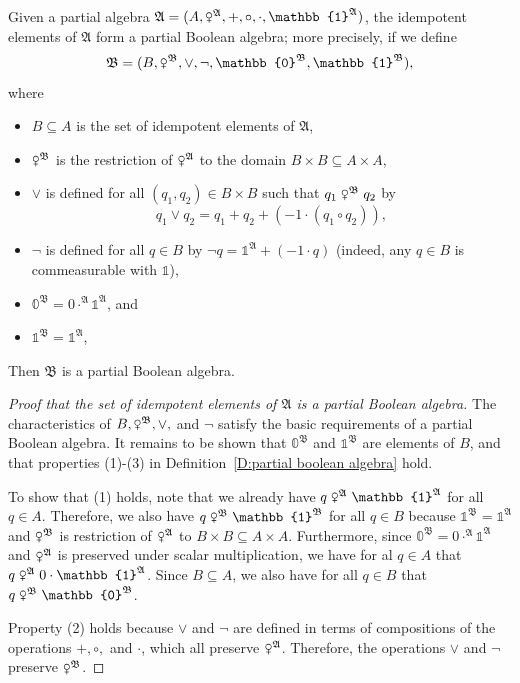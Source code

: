 \documentclass{scrartcl}
\newcommand{\FA}{\mathfrak{A}}
\newcommand{\FB}{\mathfrak{B}}
\newcommand{\com}{\mathrel{\venus}}
\begin{document}
\begin{example}
Given a partial algebra $\FA=(A,\com^{\FA},+,\circ,\cdot,\mathbb{1}^{\FA})$, the idempotent elements of $\FA$ form a partial Boolean algebra; more precisely, if we define
\[
\FB=(B,\com^{\FB},\lor,\neg,\mathbb{0}^{\FB},\mathbb{1}^{\FB}),
\]
where
\begin{itemize}
\item
$B\subseteq A$ is the set of idempotent elements of $\FA$,

\item
$\com^{\FB}$ is the restriction of $\com^{\FA}$ to the domain $B\times B\subseteq A\times A$,

\item
$\lor$ is defined for all $(q_1,q_2)\in B\times B$ such that $q_1\com^{\FB}q_2$ by
\[
q_1\lor q_2=q_1+q_2+(-1\cdot(q_1\circ q_2)),
\]

\item
$\neg$ is defined for all $q\in B$ by $\neg q=\mathbb{1}^{\FA}+(-1\cdot q)$ (indeed, any $q\in B$ is commeasurable with $\mathbb{1}$),

\item
$\mathbb{0}^{\FB}=0\cdot^{\FA}\mathbb{1}^{\FA}$, and

\item
$\mathbb{1}^{\FB}=\mathbb{1}^{\FA}$,
\end{itemize}
Then $\FB$ is a partial Boolean algebra.

\begin{proof}[Proof that the set of idempotent elements of $\FA$ is a partial Boolean algebra] The characteristics of $B,\venus^{\FB},\lor,$ and $\neg$ satisfy the basic requirements of a partial Boolean algebra. It remains to be shown that $\mathbb{0}^{\FB}$ and $\mathbb{1}^{\FB}$ are elements of $B$, and that properties (1)-(3) in Definition~\ref{D:partial boolean algebra} hold.


To show that (1) holds, note that we already have $q\com^{\FA}\mathbb{1}^{\FA}$ for all $q\in A$. Therefore, we also have $q\com^{\FB}\mathbb{1}^{\FB}$ for all $q\in B$ because $\mathbb{1}^{\FB}=\mathbb{1}^{\FA}$ and $\com^{\FB}$ is  restriction of $\com^{\FA}$ to  $B\times B\subseteq A\times A$. Furthermore, since $\mathbb{0}^{\FB}=0\cdot^{\FA}\mathbb{1}^{\FA}$ and $\com^{\FA}$ is preserved under scalar multiplication, we have for al $q\in A$ that $q\com^{\FA}0\cdot\mathbb{1}^{\FA}$. Since $B\subseteq A$, we also have for all $q\in B$ that $q\com^{\FB}\mathbb{0}^{\FB}$.

Property (2) holds because $\lor$ and $\neg$ are defined in terms of compositions of the operations $+,\circ,$ and $\cdot$, which all preserve $\com^{\FA}$. Therefore, the operations $\lor$ and $\neg$ preserve $\com^{\FB}$.


\end{proof}
\end{example}
\end{document}
